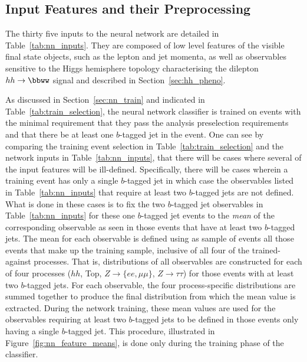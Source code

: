 %
%

\subsection{Input Features and their Preprocessing}
\label{sec:nn_preprocessing}

The thirty five inputs to the neural network are detailed in Table~\ref{tab:nn_inputs}.
They are composed of low level features of the visible final state objects, such
as the lepton and jet momenta, as well as observables sensitive to the Higgs hemisphere
topology characterising the dilepton $hh \rightarrow \bbww$ signal and described in Section~\ref{sec:hh_pheno}.

As discussed in Section~\ref{sec:nn_train} and indicated in Table~\ref{tab:train_selection}, the neural network
classifier is trained on events with the minimal requirement that they pass the analysis preselection requirements
and that there be at least one $b$-tagged jet in the event.
One can see by comparing the training event selection in Table~\ref{tab:train_selection} and the network
inputs in Table~\ref{tab:nn_inputs}, that there will be cases where several of the input features
will be ill-defined.
Specifically, there will be cases wherein a training event has only a single $b$-tagged jet in which
case the observables listed in Table~\ref{tab:nn_inputs} that require at least two $b$-tagged jets
are not defined.
What is done in these cases is to fix the two $b$-tagged jet observables in Table~\ref{tab:nn_inputs}
for these one $b$-tagged jet events to the \textit{mean} of the corresponding observable as seen in
those events that have at least two $b$-tagged jets.
The mean for each observable is defined using as sample of events all those events that make
up the training sample, inclusive of all four of the trained-against processes.
That is, distributions of all observables are constructed for each of four processes ($hh$, Top, $Z \rightarrow \{ee,\mu\mu\}$, $Z \rightarrow \tau\tau$)
for those events with at least two $b$-tagged jets.
For each observable, the four process-specific distributions are summed together to produce the final
distribution from which the mean value is extracted.
During the network training, these mean values are used for the observables requiring
at least two $b$-tagged jets to be defined in those events only having a single $b$-tagged jet.
This procedure, illustrated in Figure~\ref{fig:nn_feature_means}, is done only during the training phase of the classifier.

